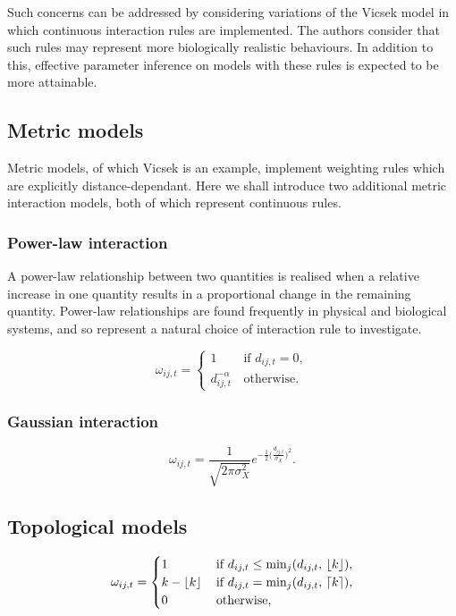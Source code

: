 Such concerns can be addressed by considering variations of the Vicsek model in which
continuous interaction rules are implemented. The authors consider that such rules may
represent more biologically realistic behaviours. In addition to this, effective
parameter inference on models with these rules is expected to be more attainable.

\subsection{Metric models}

Metric models, of which Vicsek is an example, implement weighting rules which are
explicitly distance-dependant. Here we shall introduce two additional metric interaction
models, both of which represent continuous rules.

\subsubsection{Power-law interaction}

A power-law relationship between two quantities is realised when a relative increase in
one quantity results in a proportional change in the remaining quantity. Power-law
relationships are found frequently in physical and biological systems, and so represent a
natural choice of interaction rule to investigate.

\begin{equation}
	\omega_{ij,t} =
	\begin{cases}
		1                  & \, \text{if } d_{ij,t} = 0, \\
		d_{ij,t}^{-\alpha} & \, \text{otherwise}.
	\end{cases}
\end{equation}

\subsubsection{Gaussian interaction}

\begin{equation}
	\omega_{ij,t} =
	\frac{1}{\sqrt{2\pi\sigma_X^2}}
	e^{-\frac{1}{2}\big(\frac{d_{ij,t}}{\sigma_X}\big)^2}.
\end{equation}

\subsection{Topological models}

\begin{equation}
	\omega_{ij,t} =
	\begin{cases}
		1           & \, \text{if } d_{ij, t} \leq \min_j(d_{ij,t},\, \lfloor k\rfloor), \\
		k-\lfloor k\rfloor & \, \text{if } d_{ij, t} = \min_j(d_{ij,t},\, \lceil k\rceil),     \\
		0           & \, \text{otherwise,}
	\end{cases}
\end{equation}
